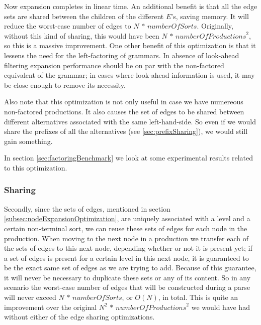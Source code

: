 \documentclass[a4paper,10pt]{article}
\begin{document}
Now expansion completes in linear time. An additional benefit is that all the edge sets are shared between the children of the different $E$'s, saving memory. It will reduce the worst-case number of edges to $N\,*\,\mathit{numberOfSorts}$. Originally, without this kind of sharing, this would have been $N\,*\,\mathit{numberOfProductions}^2$, so this is a massive improvement. One other benefit of this optimization is that it lessens the need for the left-factoring of grammars. In absence of look-ahead filtering expansion performance should be on par with the non-factored equivalent of the grammar; in cases where look-ahead information is used, it may be close enough to remove its necessity.

Also note that this optimization is not only useful in case we have numereous non-factored productions. It also causes the set of edges to be shared between different alternatives associated with the same left-hand-side. So even if we would share the prefixes of all the alternatives (see \ref{sec:prefixSharing}), we would still gain something.

In section \ref{sec:factoringBenchmark} we look at some experimental results related to this optimization.

\subsubsection{Sharing}
Secondly, since the sets of edges, mentioned in section \ref{subsec:nodeExpansionOptimization}, are uniquely associated with a level and a certain non-terminal sort, we can reuse these sets of edges for each node in the production. When moving to the next node in a production we transfer each of the sets of edges to this next node, depending whether or not it is present yet; if a set of edges is present for a certain level in this next node, it is guaranteed to be the exact same set of edges as we are trying to add. Because of this guarantee, it will never be necessary to duplicate these sets or any of its content. So in any scenario the worst-case number of edges that will be constructed during a parse will never exceed $N\,*\,\mathit{numberOfSorts}$, or $O(N)$, in total. This is quite an improvement over the original ${N}^2\,*\,\mathit{numberOfProductions}^2$ we would have had without either of the edge sharing optimizations.
\end{document}
